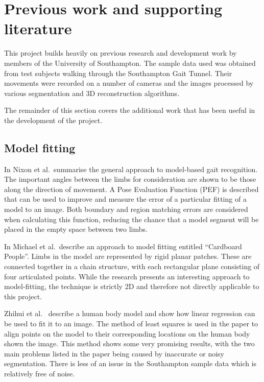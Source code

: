 \section{Previous work and supporting literature}

This project builds heavily on previous research and development work by members of the University of Southampton.
The sample data used was obtained from test subjects walking through the Southampton Gait Tunnel.
Their movements were recorded on a number of cameras and the images processed by various segmentation and 3D reconstruction algorithms.

The remainder of this section covers the additional work that has been useful in the development of the project.

\subsection{Model fitting}

In \cite{GaitBook} Nixon et al.\ summarise the general approach to model-based gait recognition.
The important angles between the limbs for consideration are shown to be those along the direction of movement.
A Pose Evaluation Function (PEF) is described that can be used to improve and measure the error of a particular fitting of a model to an image.
Both boundary and region matching errors are considered when calculating this function, reducing the chance that a model segment will be placed in the empty space between two limbs.

\bigskip
\noindent In \cite{cardboardpeople} Michael et al.\ describe an approach to model fitting entitled ``Cardboard People''.
Limbs in the model are represented by rigid planar patches.
These are connected together in a chain structure, with each rectangular plane consisting of four articulated points.
While the research presents an interesting approach to model-fitting, the technique is strictly 2D and therefore not directly applicable to this project.

\bigskip
\noindent Zhihui et al.\ \cite{LinearModelFitting} describe a human body model and show how linear regression can be used to fit it to an image.
The method of least squares is used in the paper to align points on the model to their corresponding locations on the human body shown the image.
This method shows some very promising results, with the two main problems listed in the paper being caused by inaccurate or noisy segmentation.
There is less of an issue in the Southampton sample data which is relatively free of noise.

